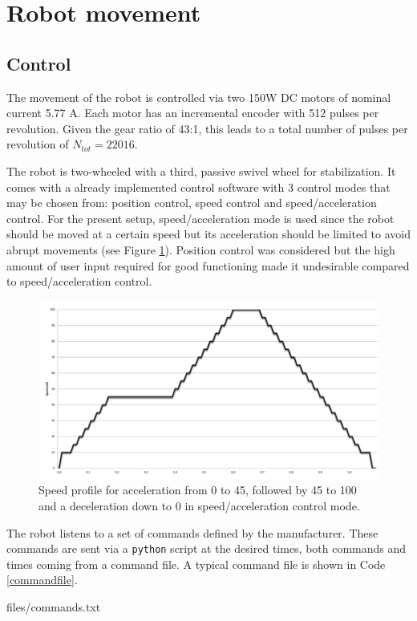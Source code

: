 \section{Robot movement}

\subsection{Control}
\label{sec:movement}

The movement of the robot is controlled via two 150W DC motors of nominal current 5.77 A. Each motor has an incremental encoder with 512 pulses per revolution. Given the gear ratio of 43:1, this leads to a total number of pulses per revolution of $N_{tot}=22016$.

The robot is two-wheeled with a third, passive swivel wheel for stabilization. It comes with a already implemented control software with 3 control modes that may be chosen from: position control, speed control and speed/acceleration control. 
For the present setup, speed/acceleration mode is used since the robot should be moved at a certain speed but its acceleration should be limited to avoid abrupt movements (see Figure \ref{fig:acceleration}).
Position control was considered but the high amount of user input required for good functioning made it undesirable compared to speed/acceleration control.

\begin{figure}[htb]
    \centering
    \includegraphics[width=0.5\linewidth]{files/Acceleration.png}
    \caption{Speed profile for acceleration from 0 to 45, followed by 45 to 100 and a deceleration down to 0 in speed/acceleration control mode.}
    \label{fig:acceleration}
\end{figure}

The robot listens to a set of commands defined by the manufacturer. These commands are sent via a \texttt{python} script at the desired times, both commands and times coming from a command file. A typical command file is shown in Code \ref{commandfile}.

\begin{center}
\begin{minipage}{0.9\linewidth}
    \begin{center}
\begin{lstinputlisting}[caption=\texttt{commands.txt}., label=commandfile, frame=none,numbers=none,xleftmargin=.45\textwidth]{files/commands.txt}
\end{lstinputlisting}
\end{center}
\end{minipage}
\end{center}

